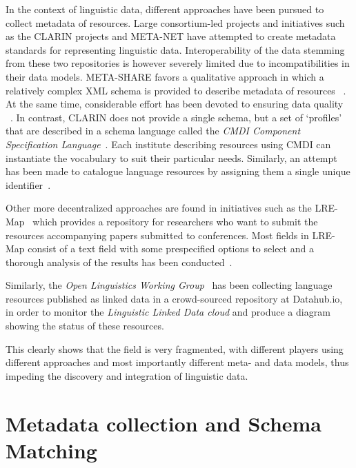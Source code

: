 \documentclass[11pt]{article}
\begin{document}
In the context of linguistic data, different approaches have been pursued to collect metadata of resources. 
Large consortium-led projects and initiatives such as the CLARIN projects and
META-NET have attempted to create metadata standards for representing linguistic data. 
Interoperability of the data stemming from these two repositories is however
severely limited due to incompatibilities in their data models.
META-SHARE favors a qualitative  approach in which a relatively complex XML
schema is provided to describe metadata of resources ~\cite{gavrilidou2012meta}.
At the same time, considerable effort has been devoted to ensuring data quality
~\cite{piperidis2012meta}.
In contrast, CLARIN does not provide a single schema, but a set of `profiles'
that are described in a schema language called the \emph{CMDI Component
Specification Language}~\cite{broeder2012cmdi}. Each institute describing
resources using CMDI can instantiate the vocabulary to suit their particular
needs. Similarly, an attempt has been made to catalogue language resources by
assigning them a single unique identifier~\cite{choukri2012using}.

Other more decentralized approaches are found in initiatives such as the
LRE-Map~\cite{calzolari2012lre} which provides a repository for researchers
who want to submit the resources accompanying papers submitted to conferences.
Most fields in LRE-Map consist of a text field with some prespecified options to
select and a thorough analysis of the results has been
conducted~\cite{mariani2014facing}.

Similarly, the \emph{Open Linguistics Working Group}~\cite{chiarcos2012open} has
been collecting language resources published as linked data in a crowd-sourced
repository at Datahub.io, in order to monitor the \emph{Linguistic Linked Data
cloud} and produce a diagram showing the status of these resources.

This clearly shows that the field is very fragmented, with different
players using different approaches and most importantly different meta- and 
data models, thus impeding the discovery and integration of linguistic data. 

\section{Metadata collection and Schema Matching}

\label{collection}
\end{document}
